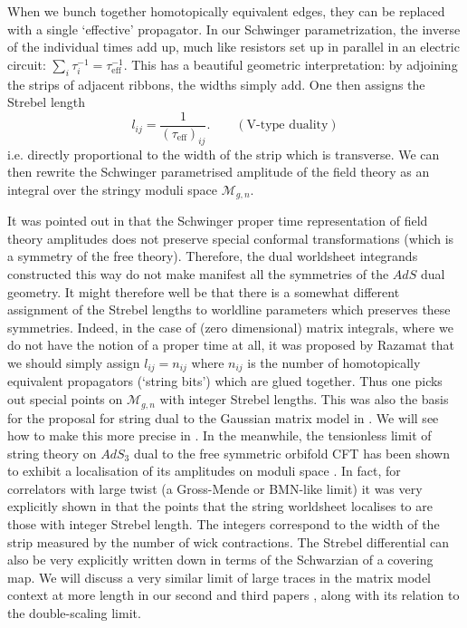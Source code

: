 \documentclass[english]{article}
\let\mc=\mathcal
\begin{document}
When we bunch together homotopically equivalent edges, they can be replaced with a single `effective' propagator. In our Schwinger parametrization, the inverse of the individual times add up, much like resistors set up in parallel in an electric circuit: $\sum_{i} \tau^{-1}_{i} = \tau^{-1}_{\text{eff}}$. This has a beautiful geometric interpretation: by adjoining the strips of adjacent ribbons, the widths simply add. One then assigns the Strebel length 
\begin{equation} \label{eq:inverseSchwinger}
     l_{ij} = \frac{1}{(\tau_{\text{eff}})_{ij}} .\qquad (\text{V-type duality})
\end{equation}
i.e. directly proportional to the width of the strip which is transverse. We can then rewrite the Schwinger parametrised amplitude of the field theory as an integral over the stringy moduli space $\mc{M}_{g,n}$.

It was pointed out in \cite{aharony2007remarks}
that the Schwinger proper time representation of field theory amplitudes does not preserve special conformal transformations (which is a symmetry of the free theory). Therefore, the dual worldsheet integrands constructed this way
do not make manifest all the symmetries of the $AdS$ dual geometry. It might therefore well be that there is a somewhat different assignment of the Strebel lengths to worldline parameters which preserves these symmetries. Indeed, in the case of (zero dimensional) matrix integrals, where we do not have the notion of a proper time at all, it was proposed by Razamat \cite{razamatGauss} that we should simply assign $l_{ij}=n_{ij}$ where $n_{ij}$ is the number of homotopically equivalent propagators (`string bits') which are glued together. Thus one picks out special points on $\mc{M}_{g,n}$ with integer Strebel lengths. This was also the basis for the proposal for string dual to the Gaussian matrix model in \cite{gopakumar2011simplest}. We will see how to make this more precise in \cite{DSDIII}. In the meanwhile, the tensionless limit of string theory on $AdS_3$ dual to the free symmetric orbifold CFT\cite{eberhardt2019worldsheet} has been shown to exhibit a localisation of its amplitudes on moduli space \cite{eberhardt2020deriving, dei2021free}. In fact, for correlators with large twist (a Gross-Mende or BMN-like limit) it was very explicitly shown in \cite{gaberdiel2021symmetric} that the points that the string worldsheet localises to are those with integer Strebel length. The integers correspond to the width of the strip measured by the number of wick contractions. The Strebel differential can also be very explicitly written down in terms of the Schwarzian of a covering map. We will discuss a very similar limit of large traces in the matrix model context at more length in our second and third papers \cite{DSDII,DSDIII}, along with its relation to the double-scaling limit.  
\end{document}
